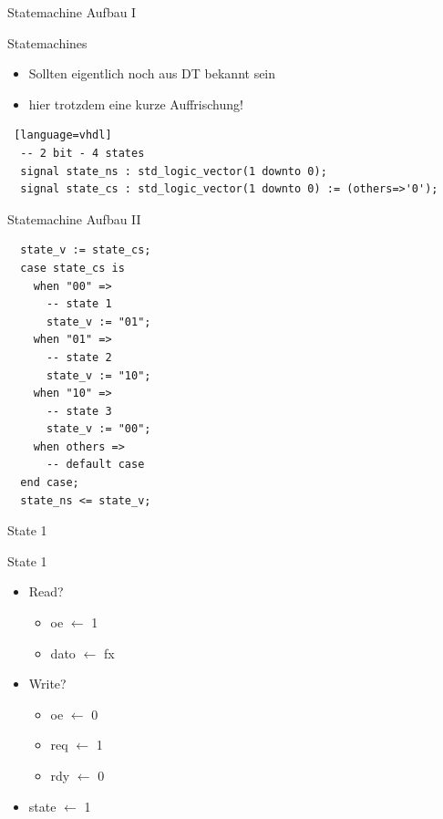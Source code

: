   \begin{frame} [fragile] {Statemachine Aufbau I}
    \begin{block} {Statemachines}
      \begin{itemize}
        \item Sollten eigentlich noch aus DT bekannt sein
        \item hier trotzdem eine kurze Auffrischung!
      \end{itemize}
    \end{block}

    \begin{lstlisting} [language=vhdl]
  -- 2 bit - 4 states
  signal state_ns : std_logic_vector(1 downto 0);
  signal state_cs : std_logic_vector(1 downto 0) := (others=>'0');
    \end{lstlisting}
  \end{frame}

  \begin{frame} [fragile] {Statemachine Aufbau II}
    \vspace{-.3cm}
    \begin{lstlisting}
  state_v := state_cs;
  case state_cs is
    when "00" =>
      -- state 1
      state_v := "01";
    when "01" =>
      -- state 2
      state_v := "10";
    when "10" =>
      -- state 3
      state_v := "00";
    when others =>
      -- default case
  end case;
  state_ns <= state_v;
    \end{lstlisting}
  \end{frame}


  \begin{frame} {State 1}
    \begin{block} {State 1}
      \begin{itemize}
        \item Read?
        \begin{itemize}
          \item oe $\leftarrow$ 1
          \item dato $\leftarrow$ fx
        \end{itemize}
        \item Write?
        \begin{itemize}
          \item oe $\leftarrow$ 0
          \item req $\leftarrow$ 1
          \item rdy $\leftarrow$ 0
        \end{itemize}
        \item state $\leftarrow$ 1
      \end{itemize}
    \end{block}
  \end{frame}

